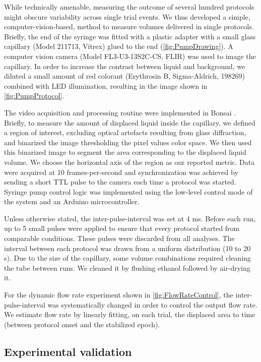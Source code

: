 While technically amenable, measuring the outcome of several hundred protocols might obscure variability across single trial events. We thus developed a simple, computer-vision-based, method to measure volumes delivered in single protocols. Briefly, the end of the syringe was fitted with a plastic adapter with a small glass capillary (Model 211713, Vitrex) glued to the end (\ref{fig:PumpDrawing}). A computer vision camera (Model FL3-U3-13S2C-CS, FLIR) was used to image the capillary.
In order to increase the contrast between liquid and background, we diluted a small amount of red colorant (Erythrosin B, Sigma-Aldrich, 198269) combined with LED illumination, resulting in the image shown in \ref{fig:PumpProtocol}.

The video acquisition and processing routine were implemented in Bonsai . Briefly, to measure the amount of displaced liquid inside the capillary, we defined a region of interest, excluding optical artefacts resulting from glass diffraction, and binarized the image thresholding the pixel values color space. We then used this binarized image to segment the area corresponding to the displaced liquid volume. We choose the horizontal axis of the region as our reported metric. Data were acquired at 10 frames-per-second and synchronization was achieved by sending a short TTL pulse to the camera each time a protocol was started. Syringe pump control logic was implemented using the low-level control mode of the system and an Arduino microcontroller.

Unless otherwise stated, the inter-pulse-interval was set at 4 ms. Before each run, up to 5 small pulses were applied to ensure that every protocol started from comparable conditions. These pulses were discarded from all analyses. The interval between each protocol was drawn from a uniform distribution (10 to 20 s). Due to the size of the capillary, some volume combinations required cleaning the tube between runs. We cleaned it by flushing ethanol followed by air-drying it.

For the dynamic flow rate experiment shown in \ref{fig:FlowRateControl}, the inter-pulse-interval was systematically changed in order to control the output flow rate. We estimate flow rate by linearly fitting, on each trial, the displaced area to time (between protocol onset and the stabilized epoch).

\subsection*{Experimental validation}

